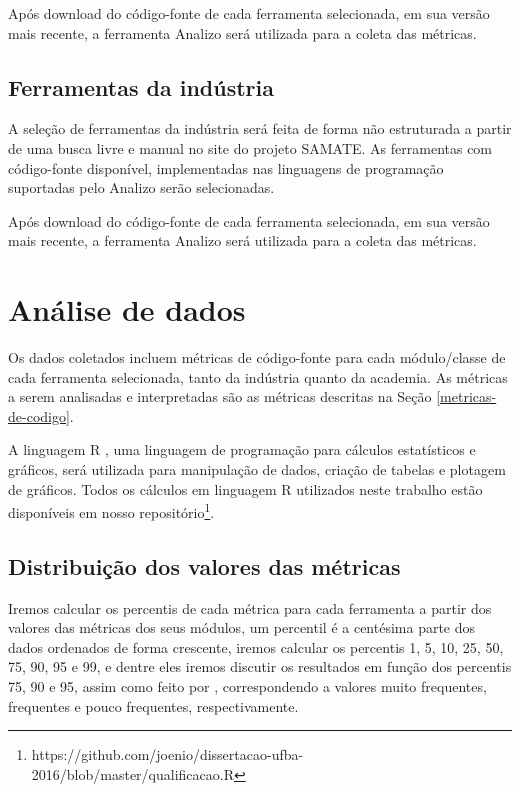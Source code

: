 Após download do código-fonte de cada ferramenta selecionada, em sua versão
mais recente, a ferramenta Analizo será utilizada para a coleta das métricas. 

\subsection{Ferramentas da indústria} \label{ferramentas-da-industria}

A seleção de ferramentas da indústria será feita de forma não estruturada a
partir de uma busca livre e manual no site do projeto SAMATE. As ferramentas
com código-fonte disponível, implementadas nas linguagens de programação
suportadas pelo Analizo serão selecionadas.

Após download do código-fonte de cada ferramenta selecionada, em sua versão
mais recente, a ferramenta Analizo será utilizada para a coleta das métricas. 

\section{Análise de dados} \label{analise}

Os dados coletados incluem métricas de código-fonte para cada módulo/classe de
cada ferramenta selecionada, tanto da indústria quanto da academia. As
métricas a serem analisadas e interpretadas são as métricas descritas na Seção
\ref{metricas-de-codigo}.

A linguagem R \cite{Ihaka1996}, uma linguagem de programação para cálculos
estatísticos e gráficos, será utilizada para manipulação de dados, criação de
tabelas e plotagem de gráficos. Todos os cálculos em linguagem R utilizados
neste trabalho estão disponíveis
em nosso repositório\footnote{https://github.com/joenio/dissertacao-ufba-2016/blob/master/qualificacao.R}.

\subsection{Distribuição dos valores das métricas}

Iremos calcular os percentis de cada métrica para cada ferramenta a partir dos
valores das métricas dos seus módulos, um percentil é a centésima parte dos
dados ordenados de forma crescente, iremos calcular os percentis 1, 5, 10, 25,
50, 75, 90, 95 e 99, e dentre eles iremos discutir os resultados em função dos
percentis 75, 90 e 95, assim como feito por ,
correspondendo a valores muito frequentes, frequentes e pouco frequentes,
respectivamente.

